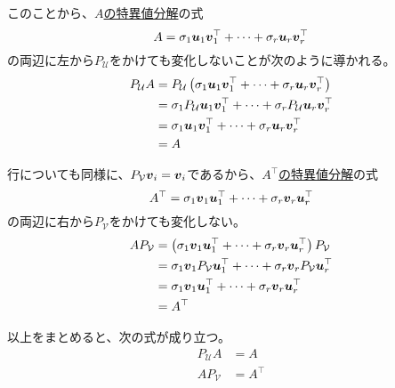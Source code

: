 \documentclass[../../../topic_linear-algebra]{subfiles}
\begin{document}
このことから、\hyperref[sec:svd-of-A]{$A$の特異値分解}の式
\begin{equation*}
  A = \sigma_1\vb*{u}_1\vb*{v}_1^\top + \cdots + \sigma_r \vb*{u}_r \vb*{v}_r^\top
\end{equation*}
の両辺に左から$P_{\mathcal{U}}$をかけても変化しないことが次のように導かれる。
\begin{align*}
  P_{\mathcal{U}} A & = P_{\mathcal{U}} \left( \sigma_1\vb*{u}_1\vb*{v}_1^\top + \cdots + \sigma_r \vb*{u}_r \vb*{v}_r^\top \right)   \\
                    & = \sigma_1 P_{\mathcal{U}} \vb*{u}_1\vb*{v}_1^\top + \cdots + \sigma_r P_{\mathcal{U}} \vb*{u}_r \vb*{v}_r^\top \\
                    & = \sigma_1 \vb*{u}_1\vb*{v}_1^\top + \cdots + \sigma_r \vb*{u}_r \vb*{v}_r^\top                                 \\
                    & = A
\end{align*}

\br

行についても同様に、$P_{\mathcal{V}}\vb*{v}_i = \vb*{v}_i$であるから、\hyperref[sec:svd-of-transpose-A]{$A^\top$の特異値分解}の式
\begin{equation*}
  A^\top = \sigma_1\vb*{v}_1\vb*{u}_1^\top + \cdots + \sigma_r \vb*{v}_r \vb*{u}_r^\top
\end{equation*}
の両辺に右から$P_{\mathcal{V}}$をかけても変化しない。
\begin{align*}
  A P_{\mathcal{V}} & = \left( \sigma_1\vb*{v}_1\vb*{u}_1^\top + \cdots + \sigma_r \vb*{v}_r \vb*{u}_r^\top \right) P_{\mathcal{V}}    \\
                    & = \sigma_1 \vb*{v}_1 P_{\mathcal{V}} \vb*{u}_1^\top + \cdots + \sigma_r \vb*{v}_r P_{\mathcal{V}} \vb*{u}_r^\top \\
                    & = \sigma_1 \vb*{v}_1\vb*{u}_1^\top + \cdots + \sigma_r \vb*{v}_r \vb*{u}_r^\top                                  \\
                    & = A^\top
\end{align*}

\br

以上をまとめると、次の式が成り立つ。
\begin{align*}
  P_{\mathcal{U}} A & = A      \\
  A P_{\mathcal{V}} & = A^\top
\end{align*}
\end{document}
